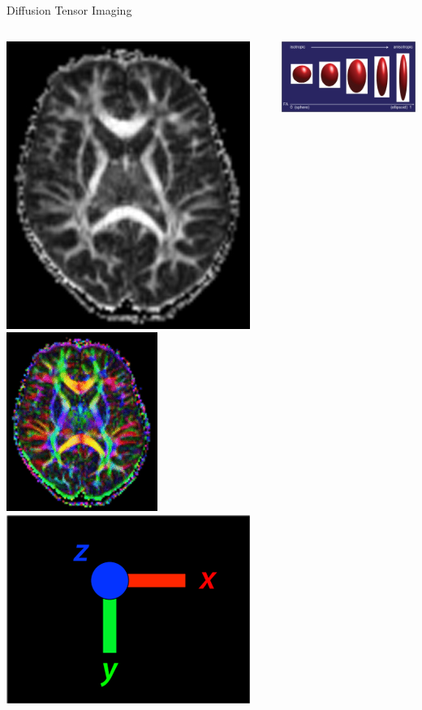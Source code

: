 \documentclass[aspectratio=169,xcolor=dvipsnames]{beamer}
\begin{document}
\begin{frame}{Diffusion Tensor Imaging}
\begin{columns}
\includegraphics[width=.4\textwidth]{imgs/FA}%
\includegraphics[width=.4\textwidth]{imgs/colorFA}%
\includegraphics[width=.2\textwidth]{imgs/colormap}

\begin{center}
\includegraphics[width=.8\textwidth]{imgs/FAtensors}
\end{center}
\end{columns}
\end{frame}

\end{document}
